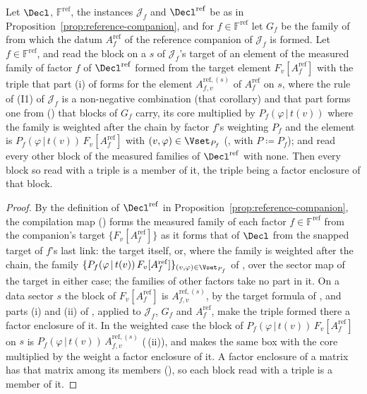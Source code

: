 \begin{corollary}\label{cor:reference-companion-factors}
Let $\Decl$, $\mathbb{F}^{\mathrm{ref}}$, the instances $\mathcal{J}_f$ and
$\Decl^{\mathrm{ref}}$ be as in Proposition~\ref{prop:reference-companion},
and for $f\in\mathbb{F}^{\mathrm{ref}}$ let $G_f$ be the family of
 from which the datum
$A^{\mathrm{ref}}_f$ of the reference companion of $\mathcal{J}_f$ is
formed. Let $f\in\mathbb{F}^{\mathrm{ref}}$, and read the block on a
 $s$ of $\mathcal{J}_f$'s target of an element of the
measured family of factor $f$ of $\Decl^{\mathrm{ref}}$ formed from the
target element $F_v[A^{\mathrm{ref}}_f]$ with the triple that part (i) of
 forms for the element
$A^{\mathrm{ref},(s)}_{f,v}$ of $A^{\mathrm{ref}}_f$ on $s$, where the rule
of (I1) of $\mathcal{J}_f$ is a non-negative combination (that corollary)
and that part forms one from 
() that blocks of $G_f$ carry, its
core multiplied by $P_f(\varphi\,|\,t(v))$ where the family is weighted after
the chain by factor $f$'s weighting $P_f$ and the element is
$P_f(\varphi\,|\,t(v))\,F_v[A^{\mathrm{ref}}_f]$ with
$(v,\varphi)\in\Vset_{P_f}$ (, with
$P\coloneqq P_f$); and read every other block of the
measured families of $\Decl^{\mathrm{ref}}$ with none. Then every block so
read with a triple is a member of it, the triple being a factor enclosure of
that block.
\end{corollary}

\begin{proof}
By the definition of $\Decl^{\mathrm{ref}}$ in
Proposition~\ref{prop:reference-companion}, the compilation map
() forms the measured family of each
factor $f\in\mathbb{F}^{\mathrm{ref}}$ from the companion's target
$\{F_v[A^{\mathrm{ref}}_f]\}$ as it forms that of $\Decl$ from the snapped
target of $f$'s last link: the target itself, or, where the family is
weighted after the chain, the family
$\{P_f(\varphi\,|\,t(v))\,F_v[A^{\mathrm{ref}}_f]\}_{(v,\varphi)\in\Vset_{P_f}}$ of
, over the sector map of the target in
either case; the families of other factors take no part in it. On a data
sector $s$ the block of $F_v[A^{\mathrm{ref}}_f]$ is
$A^{\mathrm{ref},(s)}_{f,v}$, by the target formula of
, and parts (i) and (ii) of
, applied to $\mathcal{J}_f$,
$G_f$ and $A^{\mathrm{ref}}_f$, make the triple formed there a factor
enclosure of it. In the weighted case the block of
$P_f(\varphi\,|\,t(v))\,F_v[A^{\mathrm{ref}}_f]$ on $s$ is
$P_f(\varphi\,|\,t(v))\,A^{\mathrm{ref},(s)}_{f,v}$
(\,(ii)), and
 makes the same box with the core
multiplied by the weight a factor enclosure of it. A factor enclosure of a
matrix has that matrix among its members
(), so each block read with a triple
is a member of it.
\end{proof}

